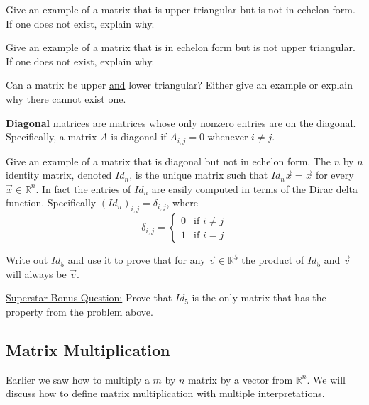 \bq Give an example of a matrix that is upper triangular but is not in echelon form. If one does not exist, explain why.
\eq

\bq Give an example of a matrix that is in echelon form but is not upper triangular. If one does not exist, explain why.
\eq

\bq Can a matrix be upper \underline{and} lower triangular? Either give an example or explain why there cannot exist one.
\eq

\textbf{Diagonal} matrices are matrices whose only nonzero entries are on the diagonal. Specifically, a matrix $A$ is diagonal if $A_{i,j}=0$ whenever $i \neq j$.

\bq Give an example of a matrix that is diagonal but not in echelon form.
\eq
The $n$ by $n$ identity matrix, denoted $Id_n$, is the unique matrix such that $Id_n \vec{x}= \vec{x}$ for every $\vec{x} \in \mathbb{R}^n$. In fact the entries of $Id_n$ are easily computed in terms of the Dirac delta function. Specifically $(Id_n)_{i,j}=\delta_{i,j}$, where $$\delta_{i,j}=\left\{ \begin{array}{cc} 0 & \mbox{if }i\neq j\\ 1 & \mbox{if } i = j \end{array} \right. $$

\bq Write out $Id_5$ and use it to prove that for any $\vec{v} \in \mathbb{R}^5$ the product of $Id_5$ and $\vec{v}$ will always be $\vec{v}$. %
\eq

\bq \underline{Superstar Bonus Question:} Prove that $Id_5$ is the only matrix that has the property from the problem above.
\begin{annotation}
\end{annotation}
\eq

\subsection{Matrix Multiplication}
Earlier we saw how to multiply a $m$ by $n$ matrix by a vector from $\mathbb{R}^n$. We will discuss how to define matrix multiplication with multiple interpretations.

